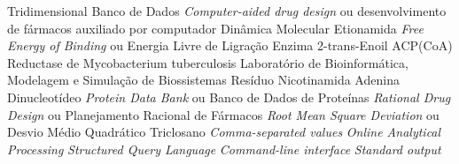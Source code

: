 \documentclass[portuguese,twoside]{pucrs-ppgcc}
\begin{document}
\begin{abstract}{lorem, ipsum, dolor, sit, amet}
Your abstract in English here. lorem ipsum dolor sit amet
consetetur sadipscing elitr sed diam nonumy eirmod tempor invidunt
ut labore et dolore magna aliquyam erat sed diam voluptua at vero
eos et accusam et justo duo dolores et ea rebum stet clita kasd
gubergren no sea takimata sanctus est lorem ipsum dolor sit amet
lorem ipsum dolor sit amet consetetur sadipscing elitr sed diam
nonumy eirmod tempor invidunt ut labore et dolore magna aliquyam
erat sed diam voluptua at
\end{abstract}

\listoffigures       %
\listoftables        %
\listofacronyms      %
\tableofcontents     %


		{Tridimensional}
		{Banco de Dados}
	{\emph{Computer-aided drug design} ou desenvolvimento de fármacos auxiliado por computador}
		{Dinâmica Molecular}
		{Etionamida}
		{\emph{Free Energy of Binding} ou Energia Livre de Ligração}
	{Enzima 2-trans-Enoil ACP(CoA) Reductase de Mycobacterium tuberculosis }
	{Laboratório de Bioinformática, Modelagem e Simulação de Biossistemas}
	{Resíduo Nicotinamida Adenina Dinucleotídeo}
		{\emph{Protein Data Bank} ou Banco de Dados de Proteínas}
		{\emph{Rational Drug Design} ou Planejamento Racional de Fármacos}
	{\emph{Root Mean Square Deviation} ou Desvio Médio Quadrático}
 	{Triclosano}
 	{\emph{Comma-separated values}}
 	{\emph{Online Analytical Processing}}
 	{\emph{Structured Query Language}}
 	{\emph{Command-line interface}}
 	{\emph{Standard output}}
\end{document}
